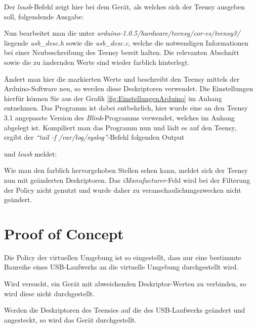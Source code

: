 Der \textit{lsusb}-Befehl zeigt hier bei dem Gerät, als welches sich der Teensy ausgeben soll, folgendende Ausgabe:



Nun bearbeitet man die unter \textit{arduino-1.0.5/hardware/teensy/cor-es/teensy3/} liegende \textit{usb\_desc.h} sowie die \textit{usb\_desc.c}, welche die notwendigen Informationen bei einer Neubeschreibung des Teensy bereit halten. Die relevanten Abschnitt sowie die zu ändernden Werte sind wieder farblich hinterlegt.





Ändert man hier die markierten Werte und beschreibt den Teensy mittels der Arduino-Software neu, so werden diese Deskriptoren verwendet. Die Einstellungen hierfür können Sie aus der Grafik \ref{fig:EinstellungenArduino} im Anhang entnehmen. Das Programm ist dabei entbehrlich, hier wurde eine an den Teensy 3.1 angepasste Version des \textit{Blink}-Programms verwendet, welches im Anhang abgelegt ist. Kompiliert man das Programm nun und lädt es auf den Teensy, ergibt der \textit{"`tail -f /var/log/syslog"'}-Befehl folgenden Output

\lstset{language=log}

und \textit{lsusb} meldet:


Wie man den farblich hervorgehoben Stellen sehen kann, meldet sich der Teensy nun mit geänderten Deskriptoren. Das \textit{iManufacturer}-Feld wird bei der Filterung der Policy nicht genutzt und wurde daher zu veranschaulichungszwecken nicht geändert.

\section{Proof of Concept} \label{PoC}
Die Policy der virtuellen Umgebung ist so eingestellt, dass nur eine  bestimmte Baureihe eines USB-Laufwerks an die virtuelle Umgebung durchgestellt wird.

\lstset{language=log}


Wird versucht, ein Gerät mit abweichenden Deskriptor-Werten zu verbinden, so wird diese nicht durchgestellt.



Werden die Deskriptoren des Teensies auf die des USB-Laufwerks geändert und angesteckt, so wird das Gerät durchgestellt.

